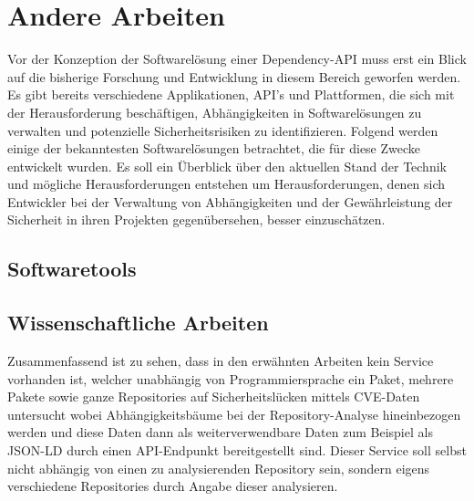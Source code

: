 \section{Andere Arbeiten} \label{sec:Andere}
    Vor der Konzeption der Softwarelösung einer Dependency-\ac{API} muss erst ein Blick auf die bisherige Forschung und Entwicklung in diesem Bereich geworfen werden.
    Es gibt bereits verschiedene Applikationen, \ac{API}'s und Plattformen, die sich mit der Herausforderung beschäftigen, Abhängigkeiten in Softwarelösungen zu verwalten und potenzielle Sicherheitsrisiken zu identifizieren.
    Folgend werden einige der bekanntesten Softwarelösungen betrachtet, die für diese Zwecke entwickelt wurden.
    Es soll ein Überblick über den aktuellen Stand der Technik und mögliche Herausforderungen entstehen um Herausforderungen, denen sich Entwickler bei der Verwaltung von Abhängigkeiten und der Gewährleistung der Sicherheit in ihren Projekten gegenübersehen, besser einzuschätzen.
    \subsection{Softwaretools} \label{subsec:Softwaretools}
    
    
    
    
    \newpage
    \subsection{Wissenschaftliche Arbeiten} \label{subsec:Wiss_Arbeiten}
    
    
    
    Zusammenfassend ist zu sehen, dass in den erwähnten Arbeiten kein Service vorhanden ist, welcher unabhängig von Programmiersprache ein Paket, mehrere Pakete sowie ganze Repositories auf Sicherheitslücken mittels \ac{CVE}-Daten untersucht wobei Abhängigkeitsbäume bei der Repository-Analyse hineinbezogen werden und diese Daten dann als weiterverwendbare Daten zum Beispiel als \ac{JSON-LD} durch einen \ac{API}-Endpunkt bereitgestellt sind.
    Dieser Service soll selbst nicht abhängig von einen zu analysierenden Repository sein, sondern eigens verschiedene Repositories durch Angabe dieser analysieren.

